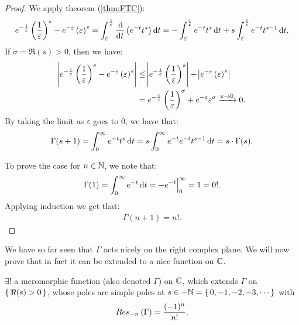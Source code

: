 \begin{proof}
We apply theorem (\ref{thm:FTC}):
\begin{align*}
    e^{-\frac{1}{\varepsilon}} \br{\frac{1}{\varepsilon}}^s - e^{-\varepsilon} \br{\varepsilon}^s = \int_\varepsilon^{\frac{1}{\varepsilon}} \frac{\dif}{\dif t} \br{ e^{-t} t^s } \dif t = - \int_\varepsilon^{\frac{1}{\varepsilon}} e^{-t} t^s \dif t + s \int_\varepsilon^{\frac{1}{\varepsilon}} e^{-t} t^{s-1} \dif t.
\end{align*}
If $\sigma = \Re(s) > 0$, then we have:
\begin{align*}
    \abs{e^{-\frac{1}{\varepsilon}} \left( \frac{1}{\varepsilon} \right)^s - e^{-\varepsilon} \left( \varepsilon \right)^s} &\leq \abs{e^{-\frac{1}{\varepsilon}} \left( \frac{1}{\varepsilon} \right)^s} + \abs{ e^{-\varepsilon} \left( \varepsilon \right)^s}\\
    &= e^{-\frac{1}{\varepsilon}} \left( \frac{1}{\varepsilon} \right)^\sigma + e^{- \varepsilon} \varepsilon^\sigma \xrightarrow[]{\varepsilon \to 0} 0.
\end{align*}
By taking the limit as $\varepsilon$ goes to $0$, we have that:
\begin{align*}
     \Gamma (s+1) =\int_0^\infty e^{-t} t^s \dif t = s \int_0^\infty e^{-t} e^{-t} t^{s-1} \dif t = s \cdot \Gamma (s).
\end{align*}

To prove the case for $n \in \mathbb{N}$, we note that:
\begin{align*}
    \Gamma(1) = \int_0^\infty e^{-t} \dif t = -e^{-t} \Big|_0^\infty = 1 = 0 !.
\end{align*}
Applying induction we get that:
\begin{align*}
    \Gamma(n+1) = n!.
\end{align*}
\end{proof}

We have so far seen that $\Gamma$ acts nicely on the right complex plane. We will now prove that in fact it can be extended to a nice function on $\mathbb{C}$.

\begin{theorem}\label{thm:g-mero-ext}
$\exists!$ a meromorphic function (also denoted $\Gamma$) on $\mathbb{C}$, which extends $\Gamma$ on $\set{ \Re(s) >0}$, whose poles are simple poles at $s \in - \mathbb{N} = \set{0 , -1, -2, -3, \cdots}$ with
\begin{align*}
    Res_{-n} \left( \Gamma \right) = \frac{(-1)^n}{n!}.
\end{align*}
\end{theorem}

